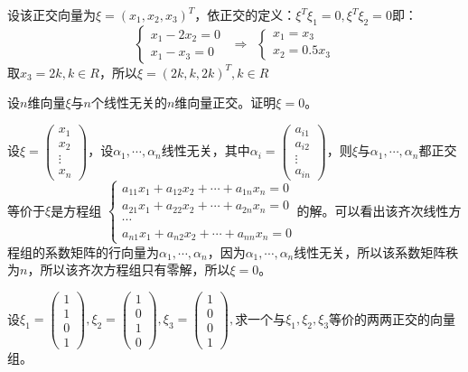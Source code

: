 \documentclass[a4paper]{report}
\begin{document}
\begin{jie}
设该正交向量为$\xi=
(x_1,x_2,x_3)^T
$，依正交的定义：$\xi^T\xi_{1}=0,\xi^{T}\xi_{2}=0$即：
\begin{equation*}
  \begin{cases}
    x_1-2x_2=0\\ x_1-x_3=0
  \end{cases}~~\Rightarrow~~
  \begin{cases}
    x_1=x_3\\
    x_2=0.5x_3
  \end{cases}
\end{equation*}
取$x_3=2k,k\in R$，所以$\xi=(2k,k,2k)^T,k\in R$
\end{jie}

\EX 设$n$维向量$\xi$与$n$个线性无关的$n$维向量正交。证明$\xi=0$。

\begin{zhengming}
设$
\xi=
\begin{pmatrix}
x_1\\x_2\\ \vdots\\x_n
\end{pmatrix}
$，设$\alpha_1,\cdots,\alpha_n$线性无关，其中$
\alpha_i=
\begin{pmatrix}
a_{i1}\\a_{i2}\\ \vdots\\a_{in}
\end{pmatrix}
$，则$\xi$与$\alpha_1,\cdots,\alpha_n$都正交等价于$\xi$是方程组
$
\begin{cases}
a_{11}x_{1}+a_{12}x_{2}+\cdots+a_{1n}x_{n}=0\\
a_{21}x_{1}+a_{22}x_{2}+\cdots+a_{2n}x_{n}=0\\
\cdots\\
a_{n1}x_{1}+a_{n2}x_{2}+\cdots+a_{nn}x_{n}=0 \end{cases}
$的解。可以看出该齐次线性方程组的系数矩阵的行向量为$\alpha_1,\cdots,\alpha_n$，因为$\alpha_1,\cdots,\alpha_n$线性无关，所以该系数矩阵秩为$n$，所以该齐次方程组只有零解，所以$\xi=0$。
\end{zhengming}

\EX 设$\xi_1=
\begin{pmatrix}
1\\1\\0\\1
\end{pmatrix},\xi_2=
\begin{pmatrix}
1\\0\\1\\0
\end{pmatrix},\xi_3=
\begin{pmatrix}
1\\0\\0\\1
\end{pmatrix},
$求一个与$\xi_1,\xi_2,\xi_3$等价的两两正交的向量组。
\end{document}
